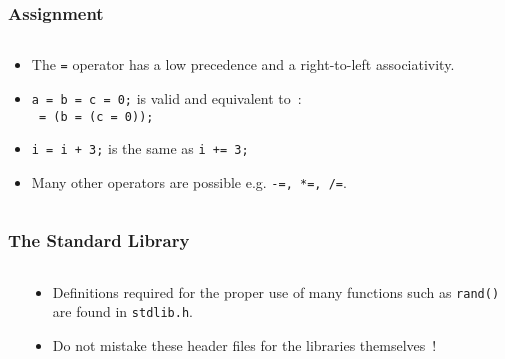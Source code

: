 \begin{frame}[fragile]
\frametitle{Assignment}

\begin{columns}
\begin{column}{0.5\textwidth}
\begin{itemize}[<+->]
\item The \verb$=$ operator has a low precedence
and a right-to-left associativity.
\item  \verb$a = b = c = 0;$ is valid and equivalent to~:\\
\verb$ = (b = (c = 0));$
\item  \verb$i = i + 3;$ is the same as \verb$i += 3;$
\item  Many other operators are possible e.g. \verb$-=, *=, /=$.
\end{itemize}
\end{column}

\pause
\begin{column}{0.5\textwidth}

\end{column}

\end{columns}
\end{frame}

\begin{frame}[fragile]
\frametitle{The Standard Library}
\begin{columns}

\begin{column}{0.60\textwidth}

\end{column}

\pause
\begin{column}{0.35\textwidth}
\begin{itemize}[<+->]
\item Definitions required for the proper use of
many functions such as \verb^rand()^
are found in \verb^stdlib.h^.
\item  Do not mistake these header files for the libraries
themselves~!
\end{itemize}
\end{column}

\end{columns}
\end{frame}
